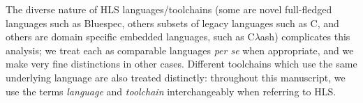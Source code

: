 
The diverse nature of HLS languages/toolchains (some are novel full-fledged languages such as Bluespec, others subsets of legacy languages such as C, and others are domain specific embedded languages, such as C$\lambda$ash) complicates this analysis; we treat each as comparable languages \textit{per se} when appropriate, and we make very fine distinctions in other cases. Different toolchains which use the same underlying language are also treated distinctly: throughout this manuscript, we use the terms \textit{language} and \textit{toolchain} interchangeably when referring to HLS.

